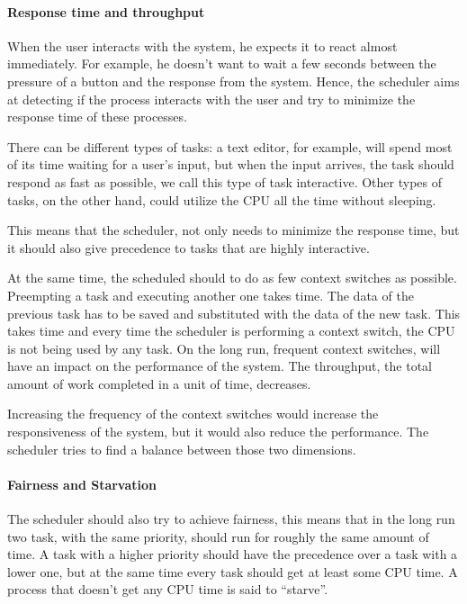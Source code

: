 \documentclass[10pt, oneside]{book}
\begin{document}
\paragraph{Response time and throughput}
When the user interacts with the system, he expects it to react almost
immediately. For example, he doesn't want to wait a few seconds
between the pressure of a button and the response from the
system. Hence, the scheduler aims at detecting if the process
interacts with the user and try to minimize the response time of these
processes.

There can be different types of tasks: a text editor, for example, will spend most of its time waiting for a user's input, but when the input arrives, the task should respond as fast as possible, we call this type of task interactive. Other types of tasks, on the other hand, could utilize the CPU all the time without sleeping.

This means that the scheduler, not only needs to minimize the response time, but it should also give precedence to tasks that are highly interactive.

At the same time, the scheduled should to do as few context switches as possible. Preempting a task and executing another one takes time. The data of the previous task has to be saved and substituted with the data of the new task. This takes time and every time the scheduler is performing a context switch, the CPU is not being used by any task. On the long run, frequent context switches, will have an impact on the performance of the system. The throughput, the total amount of work completed in a unit of time, decreases. 

Increasing the frequency of the context switches would increase the responsiveness of the system, but it would also reduce the performance. The scheduler tries to find a balance between those two dimensions.

\paragraph{Fairness and Starvation}
The scheduler should also try to achieve fairness, this means that in the long run two task, with the same priority, should run for roughly the same amount of time. A task with a higher priority should have the precedence over a task with a lower one, but at the same time every task should get at least some CPU time. A process that doesn't get any CPU time is said to ``starve''.
\end{document}
